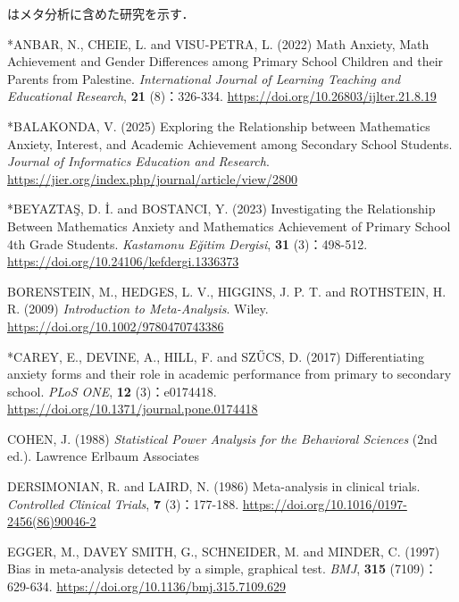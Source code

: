 \documentclass[
  lualatex, ja=standard, paper={182mm,257mm}, twocolumn, fontsize=8.5pt, baselineskip=13.5pt,
  line_length=24zw, column_gap=6.1mm, number_of_lines=45, head_space=24.5mm, gutter=16.25mm
]{jlreq}
\newcommand{\chapspaced}[1]{\par\vspace{13.5pt}\needspace{4\baselineskip}{\centering\gtfamily\bfseries #1\par}\nopagebreak}
\begin{document}
\chapspaced{参考文献}
{\noindent * はメタ分析に含めた研究を示す．\par}
{\small
\par\noindent{}\zw{} *ANBAR, N., CHEIE, L. and VISU-PETRA, L. (2022) Math Anxiety, Math Achievement and Gender Differences among Primary School Children and their Parents from Palestine. \textit{International Journal of Learning Teaching and Educational Research}, \textbf{21} (8)：326-334. \url{https://doi.org/10.26803/ijlter.21.8.19}\par
\par\noindent{}\zw{} *BALAKONDA, V. (2025) Exploring the Relationship between Mathematics Anxiety, Interest, and Academic Achievement among Secondary School Students. \textit{Journal of Informatics Education and Research}. \url{https://jier.org/index.php/journal/article/view/2800}\par
\par\noindent{}\zw{} *BEYAZTAŞ, D. İ. and BOSTANCI, Y. (2023) Investigating the Relationship Between Mathematics Anxiety and Mathematics Achievement of Primary School 4th Grade Students. \textit{Kastamonu Eğitim Dergisi}, \textbf{31} (3)：498-512. \url{https://doi.org/10.24106/kefdergi.1336373}\par
\par\noindent{}\zw{} BORENSTEIN, M., HEDGES, L. V., HIGGINS, J. P. T. and ROTHSTEIN, H. R. (2009) \textit{Introduction to Meta-Analysis}. Wiley. \url{https://doi.org/10.1002/9780470743386}\par
\par\noindent{}\zw{} *CAREY, E., DEVINE, A., HILL, F. and SZŰCS, D. (2017) Differentiating anxiety forms and their role in academic performance from primary to secondary school. \textit{PLoS ONE}, \textbf{12} (3)：e0174418. \url{https://doi.org/10.1371/journal.pone.0174418}\par
\par\noindent{}\zw{} COHEN, J. (1988) \textit{Statistical Power Analysis for the Behavioral Sciences} (2nd ed.). Lawrence Erlbaum Associates\par
\par\noindent{}\zw{} DERSIMONIAN, R. and LAIRD, N. (1986) Meta-analysis in clinical trials. \textit{Controlled Clinical Trials}, \textbf{7} (3)：177-188. \url{https://doi.org/10.1016/0197-2456(86)90046-2}\par
\par\noindent{}\zw{} EGGER, M., DAVEY SMITH, G., SCHNEIDER, M. and MINDER, C. (1997) Bias in meta-analysis detected by a simple, graphical test. \textit{BMJ}, \textbf{315} (7109)：629-634. \url{https://doi.org/10.1136/bmj.315.7109.629}\par
}
\end{document}
